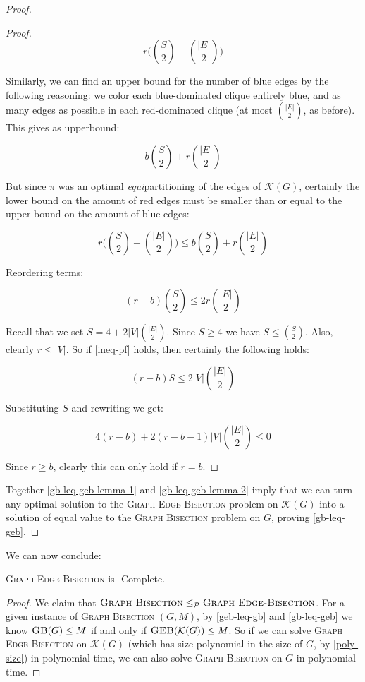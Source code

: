\documentclass{article}
\newcommand{\gb}{\textsc{Graph \allowbreak Bisection} }
\newcommand{\geb}{\textsc{Graph \allowbreak Edge-\allowbreak Bisection} }
\newcommand{\sgeb}{\textsc{GEB} }
\newcommand{\sgb}{\textsc{GB} }
\begin{document}
\begin{proof}
\begin{proof}
			$$r\Big( \binom{S}{2} - \binom{|E|}{2}\Big)$$

			Similarly, we can find an upper bound for the number of blue edges
			by the following reasoning: we color each blue-dominated clique
			entirely blue, and as many edges as possible in each red-dominated
			clique (at most $\binom{|E|}{2}$, as before). This gives as
			upperbound:

			$$b\binom{S}{2} + r\binom{|E|}{2}$$

			But since $\pi$ was an optimal \textit{equi}partitioning of the
			edges of $\mathcal{K}(G)$, certainly the lower bound on the amount
			of red edges must be smaller than or equal to the upper bound on
			the amount of blue edges:

			$$r\Big( \binom{S}{2} - \binom{|E|}{2}\Big)
				\leq b\binom{S}{2} + r\binom{|E|}{2}$$

			Reordering terms:

			\begin{equation}
				\label{ineq-pf}
				(r-b)\binom{S}{2} \leq 2r\binom{|E|}{2}
			\end{equation}

			Recall that we set $S = 4 + 2|V|\binom{|E|}{2}$. Since $S \geq 4$
			we have $S \leq \binom{S}{2}$. Also, clearly $r \leq |V|$. So if
			\autoref{ineq-pf} holds, then certainly the following holds:

			$$(r-b)S \leq 2|V|\binom{|E|}{2}$$

			Substituting $S$ and rewriting we get:

			$$4(r-b) + 2(r-b-1)|V|\binom{|E|}{2} \leq 0$$
 
			Since $r \geq b$, clearly this can only hold if $r=b$.
		\end{proof}

		Together \autoref{gb-leq-geb-lemma-1} and \autoref{gb-leq-geb-lemma-2}
		imply that we can turn any optimal solution to the \geb problem on
		$\mathcal{K}(G)$ into a solution of equal value to the \gb problem on
		$G$, proving \autoref{gb-leq-geb}.
	\end{proof}

	We can now conclude:

	\begin{theorem}
		\geb is \NP-Complete.
	\end{theorem}
	\begin{proof}
		We claim that $\gb \leq_{\mathcal{P}} \geb$.
		For a given instance of \gb $(G, M)$, by \autoref{geb-leq-gb} and
		\autoref{gb-leq-geb} we know
		$\sgb(G) \leq M$ if and only if $\sgeb(\mathcal{K}(G)) \leq M$. So
		if we can solve \geb on $\mathcal{K}(G)$ (which has size polynomial
		in the size of $G$, by \autoref{poly-size}) in polynomial time, we can
		also solve \gb on $G$ in polynomial time.
	\end{proof}
\end{document}
